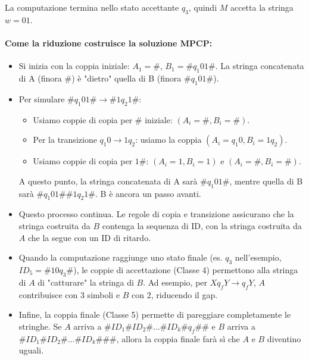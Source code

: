 \documentclass[a4paper]{article}
\theoremstyle{definition} %
\theoremstyle{remark} %
\begin{document}
La computazione termina nello stato accettante $q_3$, quindi $M$ accetta la stringa $w = 01$.

\paragraph{Come la riduzione costruisce la soluzione MPCP:}
\begin{itemize}
    \item Si inizia con la coppia iniziale: $A_1 = \#$, $B_1 = \#q_1 01\#$.
        La stringa concatenata di A (finora $\#$) è "dietro" quella di B (finora $\#q_1 01\#$).
    \item Per simulare $\#q_1 01\# \to \#1q_2 1\#$:
        \begin{itemize}
            \item Usiamo coppie di copia per $\#$ iniziale: $(A_i = \#, B_i = \#)$.
            \item Per la transizione $q_1 0 \to 1q_2$: usiamo la coppia $(A_i = q_1 0, B_i = 1q_2)$.
            \item Usiamo coppie di copia per $1\#$: $(A_i=1, B_i=1)$ e $(A_i=\#, B_i=\#)$.
        \end{itemize}
        A questo punto, la stringa concatenata di A sarà $\#q_1 01\#$, mentre quella di B sarà $\#q_1 01\# \#1q_2 1\#$. B è ancora un passo avanti.
    \item Questo processo continua. Le regole di copia e transizione assicurano che la stringa costruita da $B$ contenga la sequenza di ID, con la stringa costruita da $A$ che la segue con un ID di ritardo.
    \item Quando la computazione raggiunge uno stato finale (es. $q_3$ nell'esempio, $ID_5 = \#10q_3\#$), le coppie di accettazione (Classe 4) permettono alla stringa di $A$ di "catturare" la stringa di $B$. Ad esempio, per $Xq_f Y \to q_f Y$, $A$ contribuisce con 3 simboli e $B$ con 2, riducendo il gap.
    \item Infine, la coppia finale (Classe 5) permette di pareggiare completamente le stringhe. Se $A$ arriva a $\#ID_1\#ID_2\# \dots \#ID_k \#q_f \# \#$ e $B$ arriva a $\#ID_1\#ID_2\# \dots \#ID_k \# \# \#$, allora la coppia finale farà sì che $A$ e $B$ diventino uguali.
\end{itemize}
\end{document}
